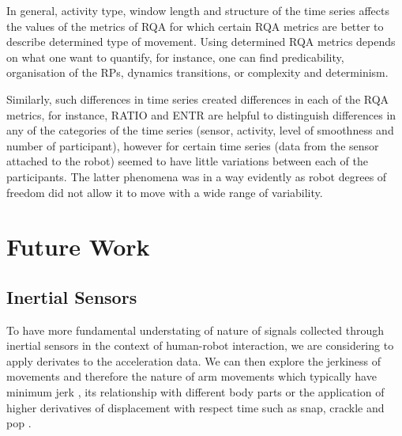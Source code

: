 In general, activity type, window length and structure of the time series 
affects the values of the metrics of RQA for which certain RQA metrics 
are better to describe determined type of movement.
Using determined RQA metrics depends on what one want to quantify, for instance, 
one can find predicability, organisation of the RPs, dynamics transitions, 
or complexity and determinism.


%
%

Similarly, such differences in time series created differences in each of the 
RQA metrics, for instance, RATIO and ENTR are helpful to distinguish 
differences in any of the categories of the time series (sensor, activity, 
level of smoothness and number of participant), however for certain time series 
(data from the sensor attached to the robot) seemed to have little variations 
between each of the participants. The latter phenomena was in a way evidently
as robot degrees of freedom did not allow it to move with a wide range of variability. 





\section{Future Work}

\subsection{Inertial Sensors}
To have more fundamental understating of nature of signals collected through 
inertial sensors in the context of human-robot interaction, we are considering to apply 
derivates to the acceleration data. We can then explore the jerkiness of movements 
and therefore the nature of arm movements which typically have minimum jerk \cite{flash1985},
its relationship with different body parts \cite{devries1982, mori2012} or
the application of higher derivatives of displacement with respect time 
such as snap, crackle and pop \cite{eager2016}.



